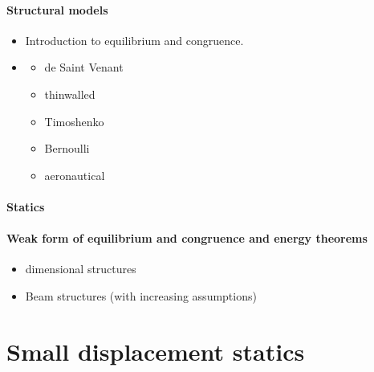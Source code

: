 \documentclass[letterpaper,10pt,english]{jupyterBook}
\begin{document}
\subsubsection*{Structural models}
\begin{itemize}
\item {} 
\sphinxAtStartPar
{} Introduction to equilibrium and congruence.

\item {} 
\sphinxAtStartPar
{}
\begin{itemize}
\item {} 
\sphinxAtStartPar
de Saint Venant

\item {} 
\sphinxAtStartPar
thin\sphinxhyphen{}walled

\item {} 
\sphinxAtStartPar
Timoshenko

\item {} 
\sphinxAtStartPar
Bernoulli

\item {} 
\sphinxAtStartPar
aeronautical

\end{itemize}

\end{itemize}
\subsubsection*{Statics}
\subsubsection*{Weak form of equilibrium and congruence and energy theorems}
\begin{itemize}
\item {} 
\sphinxhyphen{}dimensional structures

\item {} 
\sphinxAtStartPar
Beam structures (with increasing assumptions)

\end{itemize}

\sphinxstepscope


\chapter{Small displacement \sphinxhyphen{} statics}
\label{\detokenize{ch/solids/small-displacements-statics:small-displacement-statics}}\label{\detokenize{ch/solids/small-displacements-statics:solid-mechanics-intro-small-displacements-statics}}\label{\detokenize{ch/solids/small-displacements-statics::doc}}
\end{document}
